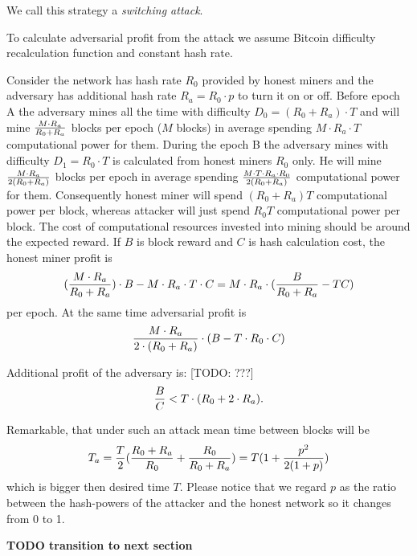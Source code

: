 \documentclass[]{llncs}
\begin{document}
We call this strategy a \textit{switching attack}.

To calculate adversarial profit from the attack we assume Bitcoin difficulty recalculation function and constant hash rate.

Consider the network has hash rate \(R_0\) provided by honest miners and the adversary has additional hash rate \(R_a=R_0\cdot p\) to turn it on or off.
Before epoch A the adversary mines all the time with difficulty \(D_0 = (R_0+R_a) \cdot T\) and will mine \(M\cdot R_a\over R_0+R_a\) blocks per epoch (\(M\) blocks) in average spending \(M \cdot R_a \cdot T\) computational power for them.
During the epoch B the adversary mines with difficulty \(D_1 = R_0 \cdot T\) is calculated from honest miners \(R_0\) only.
He will mine \(M\cdot R_a\over 2(R_0+R_a)\) blocks per epoch in average spending \(M\cdot T\cdot R_a\cdot R_0\over 2(R_0+R_a)\) computational power for them.
Consequently honest miner will spend \((R_0+R_a)T\) computational power per block, whereas attacker will just spend \(R_0T\) computational power per block.
The cost of computational resources invested into mining should be around the expected reward.
If \(B\) is block reward and \(C\) is hash calculation cost, the honest miner profit is
\begin{equation}
{({M\cdot R_a\over R_0+R_a})\cdot B-M\cdot R_a\cdot T\cdot C=M\cdot R_a\cdot ({B\over R_0+R_a}-TC)}
\end{equation}
per epoch.
At the same time adversarial profit is
\begin{equation}
{{M\cdot R_a \over 2\cdot (R_0+R_a)}\cdot (B - T\cdot R_0\cdot C)}
\end{equation}


Additional profit of the adversary is:
[TODO: ???]
\begin{equation}
{{B\over C} < T\cdot (R_0+2\cdot R_a)}.
\end{equation}



Remarkable, that under such an attack mean time between blocks will be
\begin{equation}
\label{eq:ati}
{T_a={T\over 2}({R_0+R_a\over R_0} + {R_0\over R_0+R_a})=T(1 + {p^2\over 2(1+p)})}
\end{equation}
which is bigger then desired time \(T\).
Please notice that we regard \(p\) as the ratio between the hash-powers of the attacker and the honest network so it changes from 0 to 1.

\textbf{TODO transition to next section}
\end{document}
